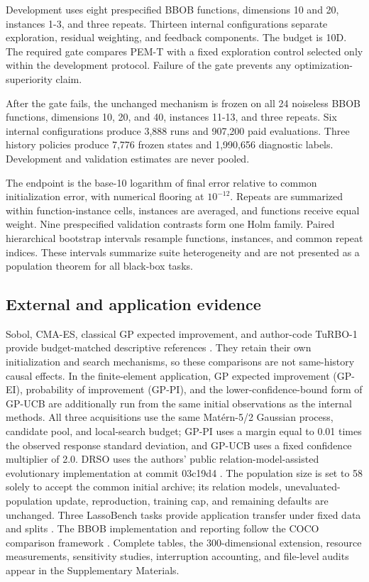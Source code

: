 \documentclass[cmc,article,submit,moreauthors,pdftex]{Definitions/tsp}
\begin{document}
Development uses eight prespecified BBOB functions, dimensions 10 and 20, instances 1-3, and three repeats. Thirteen internal configurations separate exploration, residual weighting, and feedback components. The budget is 10D. The required gate compares PEM-T with a fixed exploration control selected only within the development protocol. Failure of the gate prevents any optimization-superiority claim.

After the gate fails, the unchanged mechanism is frozen on all 24 noiseless BBOB functions, dimensions 10, 20, and 40, instances 11-13, and three repeats. Six internal configurations produce 3,888 runs and 907,200 paid evaluations. Three history policies produce 7,776 frozen states and 1,990,656 diagnostic labels. Development and validation estimates are never pooled.

The endpoint is the base-10 logarithm of final error relative to common initialization error, with numerical flooring at $10^{-12}$. Repeats are summarized within function-instance cells, instances are averaged, and functions receive equal weight. Nine prespecified validation contrasts form one Holm family. Paired hierarchical bootstrap intervals resample functions, instances, and common repeat indices. These intervals summarize suite heterogeneity and are not presented as a population theorem for all black-box tasks.

\hypertarget{external-and-application-evidence}{%
\subsection{External and application evidence}\label{external-and-application-evidence}}

Sobol, CMA-ES, classical GP expected improvement, and author-code TuRBO-1 provide budget-matched descriptive references \cite{ref-25}. They retain their own initialization and search mechanisms, so these comparisons are not same-history causal effects. In the finite-element application, GP expected improvement (GP-EI), probability of improvement (GP-PI), and the lower-confidence-bound form of GP-UCB are additionally run from the same initial observations as the internal methods. All three acquisitions use the same Matérn-5/2 Gaussian process, candidate pool, and local-search budget; GP-PI uses a margin equal to 0.01 times the observed response standard deviation, and GP-UCB uses a fixed confidence multiplier of 2.0. DRSO uses the authors' public relation-model-assisted evolutionary implementation at commit 03c19d4 \cite{ref-30}. The population size is set to 58 solely to accept the common initial archive; its relation models, unevaluated-population update, reproduction, training cap, and remaining defaults are unchanged. Three LassoBench tasks provide application transfer under fixed data and splits \cite{ref-24}. The BBOB implementation and reporting follow the COCO comparison framework \cite{ref-26}. Complete tables, the 300-dimensional extension, resource measurements, sensitivity studies, interruption accounting, and file-level audits appear in the Supplementary Materials.
\end{document}
